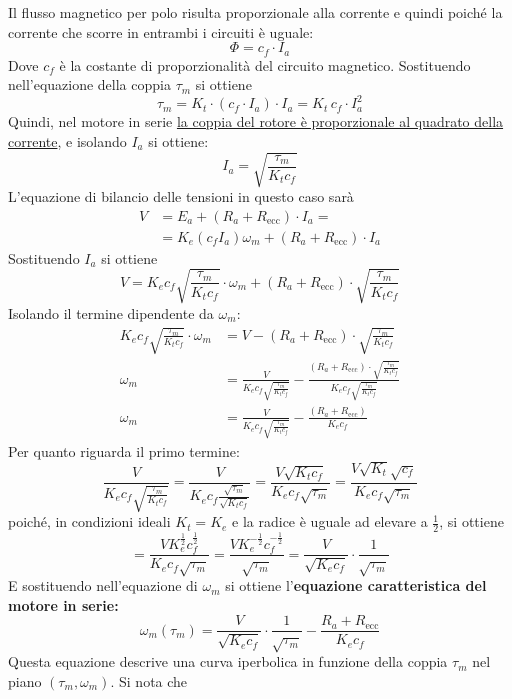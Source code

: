 ﻿\documentclass[11pt, a4paper]{article}
\begin{document}
Il flusso magnetico per polo risulta proporzionale alla corrente e quindi poiché la corrente che scorre in entrambi i circuiti è uguale:
\[
    \Phi = c_f \cdot I_a
\]
Dove $c_f$ è la costante di proporzionalità del circuito magnetico. Sostituendo nell'equazione della coppia $\tau_{m}$ si ottiene
\[
    \tau_m = K_t \cdot (c_f \cdot I_a) \cdot I_a = K_t \, c_f \cdot I_a^2
\]
Quindi, nel motore in serie \underline{la coppia del rotore è proporzionale al quadrato della corrente}, e isolando $I_{a}$ si ottiene:
\[
    I_a = \sqrt{\frac{\tau_m}{K_t c_f}}
\]
L'equazione di bilancio delle tensioni in questo caso sarà
\begin{align*}
    V &= E_a + (R_a + R_{\text{ecc}}) \cdot I_a =\\
    &= K_e (c_f I_a) \omega_m + (R_a + R_{\text{ecc}}) \cdot I_a
\end{align*}
Sostituendo $I_a$ si ottiene
\[
    V = K_e c_f \sqrt{\frac{\tau_m}{K_t c_f}} \cdot \omega_m + (R_a + R_{\text{ecc}}) \cdot \sqrt{\frac{\tau_m}{K_t c_f}}
\]
Isolando il termine dipendente da $\omega_m$:
\begin{align*}
    K_e c_f \sqrt{\frac{\tau_m}{K_t c_f}} \cdot \omega_m &= V - (R_a + R_{\text{ecc}}) \cdot \sqrt{\frac{\tau_m}{K_t c_f}}\\
    \omega_m &= \frac{V}{K_e c_f \sqrt{\frac{\tau_m}{K_t c_f}}} - \frac{(R_a + R_{\text{ecc}}) \cdot \sqrt{\frac{\tau_m}{K_t c_f}}}{K_e c_f \sqrt{\frac{\tau_m}{K_t c_f}}}\\
    \omega_m &= \frac{V}{K_e c_f \sqrt{\frac{\tau_m}{K_t c_f}}} - \frac{(R_a + R_{\text{ecc}})}{K_e c_f}
\end{align*}
Per quanto riguarda il primo termine:
\[
    \frac{V}{K_e c_f \sqrt{\frac{\tau_m}{K_t c_f}}} = \frac{V}{K_e c_f \frac{\sqrt{\tau_m}}{\sqrt{K_t c_f}}} = \frac{V \sqrt{K_t c_f}}{K_e c_f \sqrt{\tau_m}}  = \frac{V \sqrt{K_t} \sqrt{c_f}}{K_e c_f \sqrt{\tau_m}}
\]
poiché, in condizioni ideali $K_{t} = K_{e}$ e la radice è uguale ad elevare a $\frac{1}{2}$, si ottiene
\[
    = \frac{V K_{e}^{\frac{1}{2}} c_{f}^{\frac{1}{2}}}{K_e c_f \sqrt{\tau_m}} = \frac{V K_{e}^{-\frac{1}{2}} c_{f}^{-\frac{1}{2}}}{ \sqrt{\tau_m}} = \frac{V}{\sqrt{K_e c_f}} \cdot \frac{1}{\sqrt{\tau_m}}
\]
E sostituendo nell'equazione di $\omega_{m}$ si ottiene l'\textbf{equazione caratteristica del motore in serie:}
\[
    \omega_m(\tau_m) = \frac{V}{\sqrt{K_e c_f}} \cdot \frac{1}{\sqrt{\tau_m}} - \frac{R_a + R_{\text{ecc}}}{K_e c_f}
    \label{eq:caratteristica_serie}
\]
Questa equazione descrive una curva iperbolica in funzione della coppia $\tau_{m}$ nel piano $(\tau_m, \omega_m)$. Si nota che
\end{document}
